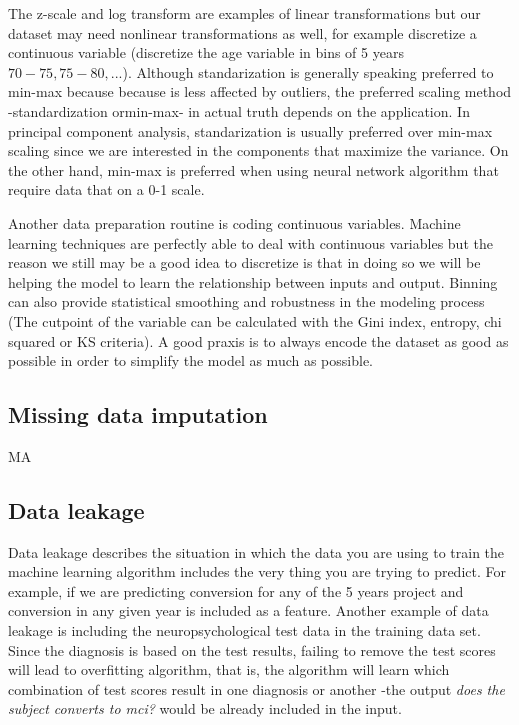 \documentclass[11pt]{article}
\theoremstyle{definition}
\theoremstyle{remark}
\begin{document}
The z-scale and log transform are examples of linear transformations but our dataset may need nonlinear transformations as well, for example discretize a continuous variable (discretize the age variable in bins of 5 years $70-75, 75-80, ...$). Although standarization is generally speaking preferred to min-max because because is less affected by outliers, the preferred scaling method -standardization ormin-max- in actual truth depends on the application. In principal component analysis, standarization is usually preferred over min-max scaling since we are interested in the components that maximize the variance.
On the other hand, min-max is preferred when using neural network algorithm that require data that on a 0-1 scale.

Another data preparation routine is coding continuous variables. Machine learning techniques are perfectly able to deal with continuous variables but the reason we still may be a good idea to discretize is that in doing so we will be helping the model to learn the relationship between inputs and output. Binning can also provide statistical smoothing and robustness in the modeling process (The cutpoint of the variable can be calculated with the Gini index, entropy, chi squared or KS criteria).
A good praxis is to always encode the dataset as good as possible in order to simplify the model as much as possible.

\subsection{Missing data imputation}
\label{sse:miss}
MA

\subsection{Data leakage}
\label{sse:dl}
Data leakage describes the situation in which the data you are using to train the machine learning algorithm includes the very thing you are trying to predict. For example, if we are predicting conversion for any of the 5 years project and conversion in any given year is included as a feature.
Another example of data leakage is including the neuropsychological test data in the training data set. Since the diagnosis is based on the test results, failing to remove the test scores will lead to overfitting algorithm, that is, the algorithm will learn which combination of test scores result in one diagnosis or another -the output \emph{does the subject converts to mci?} would be already included in the input.
\end{document}
